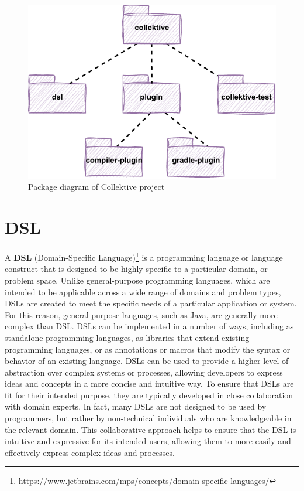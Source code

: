 \begin{figure}[!ht]
    \centering
    \includegraphics[scale=1.1]{document/chapters/4-collektive/images/collektive_package_diagram.pdf}
    \caption{Package diagram of Collektive project}
    \label{fig:collektive_package_diagram}
\end{figure}

\section{DSL}\label{section:dsl}
A \textbf{DSL} (Domain-Specific Language)\footnote{\url{https://www.jetbrains.com/mps/concepts/domain-specific-languages/}} is a programming language or language construct that is designed to be highly specific to a particular domain, or problem space. Unlike general-purpose programming languages, which are intended to be applicable across a wide range of domains and problem types, DSLs are created to meet the specific needs of a particular application or system. For this reason, general-purpose languages, such as Java, are generally more complex than DSL.\newline 
DSLs can be implemented in a number of ways, including as standalone programming languages, as libraries that extend existing programming languages, or as annotations or macros that modify the syntax or behavior of an existing language. DSLs can be used to provide a higher level of abstraction over complex systems or processes, allowing developers to express ideas and concepts in a more concise and intuitive way.\newline
To ensure that DSLs are fit for their intended purpose, they are typically developed in close collaboration with domain experts. In fact, many DSLs are not designed to be used by programmers, but rather by non-technical individuals who are knowledgeable in the relevant domain. This collaborative approach helps to ensure that the DSL is intuitive and expressive for its intended users, allowing them to more easily and effectively express complex ideas and processes.


